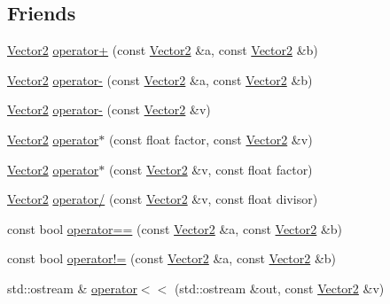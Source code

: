 \subsection*{Friends}
\begin{DoxyCompactItemize}
\item 
\hyperlink{classprism_1_1geometry_1_1_vector2}{Vector2} \hyperlink{classprism_1_1geometry_1_1_vector2_a43adb85199fdc6ae1f9ba0397660ad9a}{operator+} (const \hyperlink{classprism_1_1geometry_1_1_vector2}{Vector2} \&a, const \hyperlink{classprism_1_1geometry_1_1_vector2}{Vector2} \&b)
\item 
\hyperlink{classprism_1_1geometry_1_1_vector2}{Vector2} \hyperlink{classprism_1_1geometry_1_1_vector2_a6132994fe4bbe4bd94b3bd1dbb83d5cf}{operator-\/} (const \hyperlink{classprism_1_1geometry_1_1_vector2}{Vector2} \&a, const \hyperlink{classprism_1_1geometry_1_1_vector2}{Vector2} \&b)
\item 
\hyperlink{classprism_1_1geometry_1_1_vector2}{Vector2} \hyperlink{classprism_1_1geometry_1_1_vector2_a3f08196e8b25ab8789db503aa50ae564}{operator-\/} (const \hyperlink{classprism_1_1geometry_1_1_vector2}{Vector2} \&v)
\item 
\hyperlink{classprism_1_1geometry_1_1_vector2}{Vector2} \hyperlink{classprism_1_1geometry_1_1_vector2_afe2f3c89eb55595919121a94cfaa4c81}{operator$\ast$} (const float factor, const \hyperlink{classprism_1_1geometry_1_1_vector2}{Vector2} \&v)
\item 
\hyperlink{classprism_1_1geometry_1_1_vector2}{Vector2} \hyperlink{classprism_1_1geometry_1_1_vector2_ad0b580b5cac3d5fdf13ac4db0c85be2b}{operator$\ast$} (const \hyperlink{classprism_1_1geometry_1_1_vector2}{Vector2} \&v, const float factor)
\item 
\hyperlink{classprism_1_1geometry_1_1_vector2}{Vector2} \hyperlink{classprism_1_1geometry_1_1_vector2_a41289aa7adf3d51186f6c2805e5d0fa6}{operator/} (const \hyperlink{classprism_1_1geometry_1_1_vector2}{Vector2} \&v, const float divisor)
\item 
const bool \hyperlink{classprism_1_1geometry_1_1_vector2_a1393036fc72fa2140bdada67b3715d93}{operator==} (const \hyperlink{classprism_1_1geometry_1_1_vector2}{Vector2} \&a, const \hyperlink{classprism_1_1geometry_1_1_vector2}{Vector2} \&b)
\item 
const bool \hyperlink{classprism_1_1geometry_1_1_vector2_a6994cbd6248d3523a38ee0f20cce9c85}{operator!=} (const \hyperlink{classprism_1_1geometry_1_1_vector2}{Vector2} \&a, const \hyperlink{classprism_1_1geometry_1_1_vector2}{Vector2} \&b)
\item 
std\+::ostream \& \hyperlink{classprism_1_1geometry_1_1_vector2_a077027eaf020d591b263437d2949c850}{operator$<$$<$} (std\+::ostream \&out, const \hyperlink{classprism_1_1geometry_1_1_vector2}{Vector2} \&v)
\end{DoxyCompactItemize}


